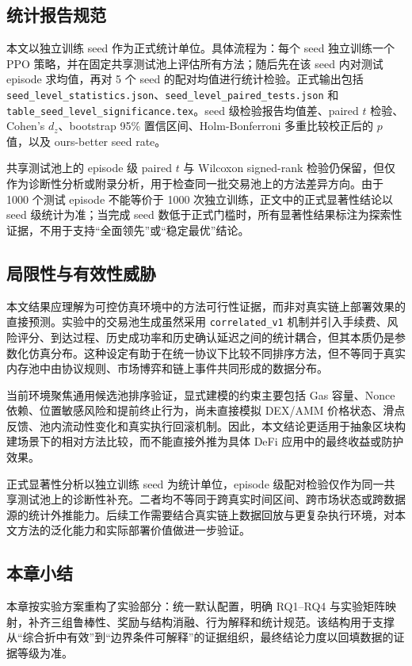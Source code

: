 \subsection{统计报告规范}

本文以独立训练 seed 作为正式统计单位。具体流程为：每个 seed 独立训练一个 PPO 策略，并在固定共享测试池上评估所有方法；随后先在该 seed 内对测试 episode 求均值，再对 5 个 seed 的配对均值进行统计检验。正式输出包括 \texttt{seed\_level\_statistics.json}、\texttt{seed\_level\_paired\_tests.json} 和 \texttt{table\_seed\_level\_significance.tex}。seed 级检验报告均值差、paired $t$ 检验、Cohen's $d_z$、bootstrap 95\% 置信区间、Holm-Bonferroni 多重比较校正后的 $p$ 值，以及 ours-better seed rate。

共享测试池上的 episode 级 paired $t$ 与 Wilcoxon signed-rank 检验仍保留，但仅作为诊断性分析或附录分析，用于检查同一批交易池上的方法差异方向。由于 1000 个测试 episode 不能等价于 1000 次独立训练，正文中的正式显著性结论以 seed 级统计为准；当完成 seed 数低于正式门槛时，所有显著性结果标注为探索性证据，不用于支持“全面领先”或“稳定最优”结论。

\subsection{局限性与有效性威胁}

本文结果应理解为可控仿真环境中的方法可行性证据，而非对真实链上部署效果的直接预测。实验中的交易池生成虽然采用 \texttt{correlated\_v1} 机制并引入手续费、风险评分、到达过程、历史成功率和历史确认延迟之间的统计耦合，但其本质仍是参数化仿真分布。这种设定有助于在统一协议下比较不同排序方法，但不等同于真实内存池中由协议规则、市场博弈和链上事件共同形成的数据分布。

当前环境聚焦通用候选池排序验证，显式建模的约束主要包括 Gas 容量、Nonce 依赖、位置敏感风险和提前终止行为，尚未直接模拟 DEX/AMM 价格状态、滑点反馈、池内流动性变化和真实执行回滚机制。因此，本文结论更适用于抽象区块构建场景下的相对方法比较，而不能直接外推为具体 DeFi 应用中的最终收益或防护效果。

正式显著性分析以独立训练 seed 为统计单位，episode 级配对检验仅作为同一共享测试池上的诊断性补充。二者均不等同于跨真实时间区间、跨市场状态或跨数据源的统计外推能力。后续工作需要结合真实链上数据回放与更复杂执行环境，对本文方法的泛化能力和实际部署价值做进一步验证。

\subsection{本章小结}

本章按实验方案重构了实验部分：统一默认配置，明确 RQ1--RQ4 与实验矩阵映射，补齐三组鲁棒性、奖励与结构消融、行为解释和统计规范。该结构用于支撑从“综合折中有效”到“边界条件可解释”的证据组织，最终结论力度以回填数据的证据等级为准。
